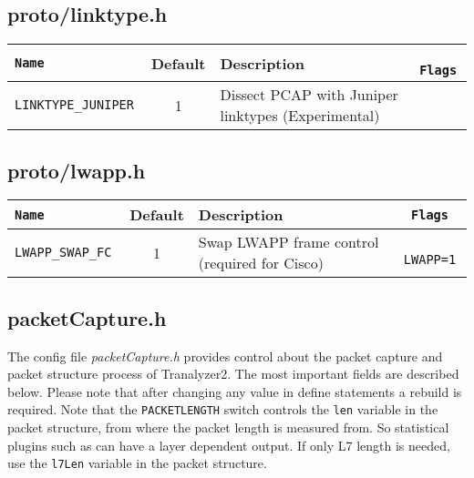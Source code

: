\subsection{proto/linktype.h}\label{proto-linktype.h}
\begin{longtable}{>{\tt}lcl>{\tt\small}l}
    \toprule
    {\bf Name} & {\bf Default} & {\bf Description} & {\bf Flags}\\
    \midrule\endhead%
    LINKTYPE\_JUNIPER & 1 & Dissect PCAP with Juniper linktypes (Experimental) & \\
    \bottomrule
\end{longtable}

\subsection{proto/lwapp.h}\label{proto-lwapp.h}
\begin{longtable}{>{\tt}lcl>{\tt\small}l}
    \toprule
    {\bf Name} & {\bf Default} & {\bf Description} & {\bf Flags}\\
    \midrule\endhead%
    LWAPP\_SWAP\_FC & 1 & Swap LWAPP frame control (required for Cisco) & LWAPP=1\\
    \bottomrule
\end{longtable}

\subsection{packetCapture.h}\label{packetCapture.h}
The config file {\em packetCapture.h} provides control about the packet capture and packet structure process of Tranalyzer2.
The most important fields are described below. Please note that after changing any value in define statements a rebuild is required.
Note that the {\tt PACKETLENGTH} switch controls the {\tt len} variable in the packet structure, from where the packet length is
measured from. So statistical plugins such as  can have a layer dependent output. If only L7 length is needed,
use the {\tt l7Len} variable in the packet structure.

